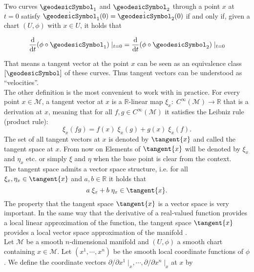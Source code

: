 \begin{proposition}
    Two curves $\geodesicSymbol_1$ and $\geodesicSymbol_2$ through a point $x$ at $t = 0$ satisfy $\dot{\geodesicSymbol}_1(0) = \dot{\geodesicSymbol}_2(0)$ if and only if, given a chart $(U, \phi)$ with $x \in U$, it holds that

    \begin{equation*}
        \frac{\mathrm{d}}{\mathrm{d}t} (\phi \circ \geodesicSymbol_1)\; \vert_{t = 0} = \frac{\mathrm{d}}{\mathrm{d}t} (\phi \circ \geodesicSymbol_2)\; \vert_{t = 0} 
    \end{equation*}\end{proposition}

That means a tangent vector at the point $x$ can be seen as an equivalence class $[\geodesicSymbol]$ of these curves. Thus tangent vectors can be understood as “velocities”. \\
The other definition is the most convenient to work with in practice. For every point $x \in \mathcal{M}$, a tangent vector at $x$ is a $\mathbb{R}$-linear map $\xi_x \colon \; C^{\infty}(\mathcal{M}) \to \mathbb{R}$ that is a derivation at $x$, meaning that for all $f, g\in C^{\infty}(\mathcal{M})$ it satisfies the Leibniz rule (product rule):
\begin{equation}\label{LeibnizRule}
    \xi_x(fg) = f(x) \; \xi_x(g) + g(x) \; \xi_x(f).
\end{equation}
The set of all tangent vectors at $x$ is denoted by $\tangent{x}$ and called the tangent space at $x$. From now on Elements of $\tangent{x}$ will be denoted by $\xi_x$ and $\eta_x$ etc. or simply $\xi$ and $\eta$ when the base point is clear from the context. \\
The tangent space admits a vector space structure, i.e. for all $\xi_x, \eta_x \in \tangent{x}$ and $a, b \in \mathbb{R}$ it holds that
\begin{equation*}
    a \; \xi_x + b \; \eta_x \in \tangent{x}.
\end{equation*}
The property that the tangent space $\tangent{x}$ is a vector space is very important. In the same way that the derivative of a real-valued function provides a local linear approximation of the function, the tangent space $\tangent{x}$ provides a local vector space approximation of the manifold \cite[p.~34]{AbsilMahonySepulchre:2008}. \\
Let $\mathcal{M}$ be a smooth $n$-dimensional manifold and $(U, \phi)$ a smooth chart containing $x \in \mathcal{M}$. Let $(x^1, \cdots, x^n)$ be the smooth local coordinate functions of $\phi$. We define the coordinate vectors $\partial / \partial x^1 \; \vert_x, \cdots, \partial / \partial x^n \; \vert_x$ at $x$ by 
